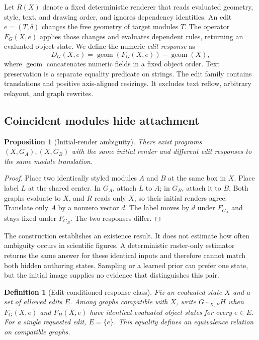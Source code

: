 \documentclass{article}
\newtheorem{proposition}{Proposition}
\newtheorem{definition}{Definition}
\begin{document}
Let $R(X)$ denote a fixed deterministic renderer that reads evaluated geometry, style, text, and drawing order, and ignores dependency identities. An edit $e=(T,\delta)$ changes the free geometry of target modules $T$. The operator $F_G(X,e)$ applies those changes and evaluates dependent rules, returning an evaluated object state. We define the numeric \emph{edit response} as
\begin{equation}
 D_G(X,e)=\operatorname{geom}(F_G(X,e))-\operatorname{geom}(X),
\end{equation}
where $\operatorname{geom}$ concatenates numeric fields in a fixed object order. Text preservation is a separate equality predicate on strings. The edit family contains translations and positive axis-aligned resizings. It excludes text reflow, arbitrary relayout, and graph rewrites.

\subsection{Coincident modules hide attachment}
\begin{proposition}[Initial-render ambiguity]
There exist programs $(X,G_A),(X,G_B)$ with the same initial render and different edit responses to the same module translation.
\end{proposition}
\begin{proof}
Place two identically styled modules $A$ and $B$ at the same box in $X$. Place label $L$ at the shared center. In $G_A$, attach $L$ to $A$; in $G_B$, attach it to $B$. Both graphs evaluate to $X$, and $R$ reads only $X$, so their initial renders agree. Translate only $A$ by a nonzero vector $d$. The label moves by $d$ under $F_{G_A}$ and stays fixed under $F_{G_B}$. The two responses differ.
\end{proof}

The construction establishes an existence result. It does not estimate how often ambiguity occurs in scientific figures. A deterministic raster-only estimator returns the same answer for these identical inputs and therefore cannot match both hidden authoring states. Sampling or a learned prior can prefer one state, but the initial image supplies no evidence that distinguishes this pair.

\begin{definition}[Edit-conditioned response class]
Fix an evaluated state $X$ and a set of allowed edits $E$. Among graphs compatible with $X$, write $G\sim_{X,E}H$ when $F_G(X,e)$ and $F_H(X,e)$ have identical evaluated object states for every $e\in E$. For a single requested edit, $E=\{e\}$. This equality defines an equivalence relation on compatible graphs.
\end{definition}
\end{document}
